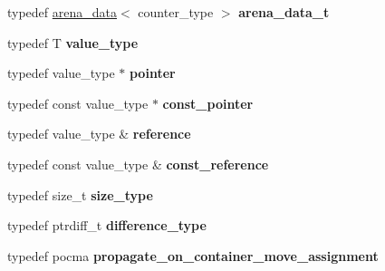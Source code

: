 \begin{DoxyCompactItemize}
\item 
\hypertarget{structarena_a53a157617d9123d17d3103562362a0dd}{}typedef \hyperlink{structarena__data}{arena\+\_\+data}$<$ counter\+\_\+type $>$ {\bfseries arena\+\_\+data\+\_\+t}\label{structarena_a53a157617d9123d17d3103562362a0dd}

\item 
\hypertarget{structarena_ab391d5c5156693eea818002b70764692}{}typedef T {\bfseries value\+\_\+type}\label{structarena_ab391d5c5156693eea818002b70764692}

\item 
\hypertarget{structarena_a67ec504de6ee2666158723ab708cfe50}{}typedef value\+\_\+type $\ast$ {\bfseries pointer}\label{structarena_a67ec504de6ee2666158723ab708cfe50}

\item 
\hypertarget{structarena_a23710b2e62626667cdd1f1b58cbfbad3}{}typedef const value\+\_\+type $\ast$ {\bfseries const\+\_\+pointer}\label{structarena_a23710b2e62626667cdd1f1b58cbfbad3}

\item 
\hypertarget{structarena_a43215476ff0c1e4f3be5784a2d00c0e0}{}typedef value\+\_\+type \& {\bfseries reference}\label{structarena_a43215476ff0c1e4f3be5784a2d00c0e0}

\item 
\hypertarget{structarena_ae69460f4772b2fc8f46e9530c7ef8ec5}{}typedef const value\+\_\+type \& {\bfseries const\+\_\+reference}\label{structarena_ae69460f4772b2fc8f46e9530c7ef8ec5}

\item 
\hypertarget{structarena_a8d5bf76d672b7f43cbc9a525874283d4}{}typedef size\+\_\+t {\bfseries size\+\_\+type}\label{structarena_a8d5bf76d672b7f43cbc9a525874283d4}

\item 
\hypertarget{structarena_adfdb600062986c291dd4c2ee534fa312}{}typedef ptrdiff\+\_\+t {\bfseries difference\+\_\+type}\label{structarena_adfdb600062986c291dd4c2ee534fa312}

\item 
\hypertarget{structarena_acb2ada8ed41c121d918130cfd93fb4a9}{}typedef pocma {\bfseries propagate\+\_\+on\+\_\+container\+\_\+move\+\_\+assignment}\label{structarena_acb2ada8ed41c121d918130cfd93fb4a9}

\end{DoxyCompactItemize}
